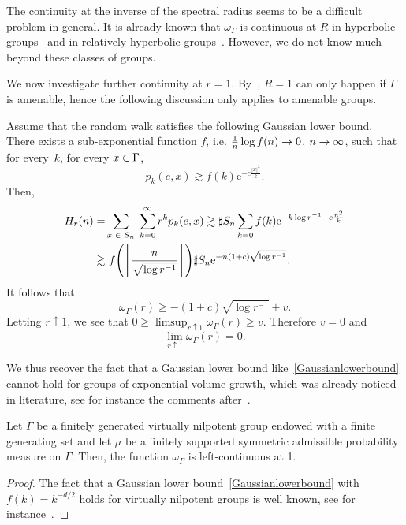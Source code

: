 \documentclass[AHL,Unicode,longabstracts]{cedram}
\newcommand{\rme}{\mathrm{e}}
\let\originalleft\left
\let\originalright\right
\renewcommand{\left}{\mathopen{}\mathclose\bgroup\originalleft}
\renewcommand{\right}{\aftergroup\egroup\originalright}
\let\oldin\in
\renewcommand{\in}{\mathchoice{\oldin}{\oldin}{\,\oldin\,}{\,\oldin\,}}
\renewcommand*{\to}{\mathchoice{\longrightarrow}{\rightarrow}{\rightarrow}{\rightarrow}}
\begin{document}
The continuity at the inverse of the spectral radius seems to be a difficult problem in general. It is already known that $\omega_\Gamma$ is continuous at $R$ in hyperbolic groups~\cite[Theorem~1.1]{SWX} and in relatively hyperbolic groups~\cite[Theorem~1.1]{DWY}. However, we do not know much beyond these classes of groups.


We now investigate further continuity at $r=1$. By~\cite[Theorem~12.5]{Woessbook}, $R=1$ can only happen if $\Gamma$ is amenable, hence the following discussion only applies to amenable groups.

Assume that the random walk satisfies the following Gaussian lower bound. There exists a sub-exponential function $f$, i.e. $\frac{1}{n}\log f(n)\to 0$, $n\to \infty$, such that for every~$k$, for every $x\in \Gamma$,
\begin{equation}\label{Gaussianlowerbound}
p_k(e, x) \gtrsim f(k) \rme^{- c \frac{|x|^2}{k}}.
\end{equation}
Then,
\begin{align*}
H_r(n) =& \sum_{x \in S_n}\;\sum_{k = 0}^{\infty} r^k p_k(e, x)
\gtrsim \sharp S_n \sum_{k = 0} f(k) \rme^{- k \log r^{-1} - c \frac{n^2}{k}} \\
\gtrsim & \ f\left(\left \lfloor \frac{n}{\sqrt{\log r^{-1}}} \right \rfloor \right)\sharp S_n \rme^{- n (1 + c) \sqrt{\log r^{-1}}}.
\end{align*}
It follows that
\[
\omega_{\Gamma}(r) \geq -(1 + c) \sqrt{\log r^{-1}} + v.
\]
Letting $r \uparrow 1$, we see that $0 \geq \limsup_{r \uparrow 1} \omega_{\Gamma}(r) \geq v$. Therefore $v = 0$ and
\[
\lim_{r \uparrow 1} \omega_{\Gamma}(r) = 0.
\]



\begin{rema}
We thus recover the fact that a Gaussian lower bound like~\eqref{Gaussianlowerbound} cannot hold for groups of exponential volume growth, which was already noticed in literature, see for instance the comments after~\cite[(0.3)]{Alexopoulospolycyclic}.
\end{rema}

\begin{prop}
Let $\Gamma$ be a finitely generated virtually nilpotent group endowed with a finite generating set and let $\mu$ be a finitely supported symmetric admissible probability measure on $\Gamma$. Then, the function $\omega_\Gamma$ is left-continuous at 1.
\end{prop}

\begin{proof}
The fact that a Gaussian lower bound~\eqref{Gaussianlowerbound} with $f(k)=k^{-d/2}$ holds for virtually nilpotent groups is well known, see for instance~\cite[Corollary~1.9]{Alexopoulos}.
\end{proof}
\end{document}
